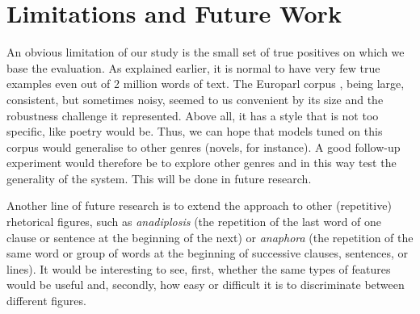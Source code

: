 \documentclass[11pt]{article}
\begin{document}
\section{Limitations and Future Work}

An obvious limitation of our study is the small set of true positives on which we base the evaluation. As explained earlier, it is normal to have very few true examples even out of 2 million words of text. The Europarl corpus \cite{koehn2005}, being large, consistent, but sometimes noisy, seemed to us convenient by its size and the robustness challenge it represented. Above all, it has a style that is not too specific, like poetry would be. Thus, we can hope that models tuned on this corpus would generalise to other genres (novels, for instance). A good follow-up experiment would therefore be to explore other genres and in this way test the generality of the system. This will be done in future research. 


Another line of future research is to extend the approach to other (repetitive) rhetorical figures, such as \emph{anadiplosis} (the repetition of the last word of one clause or sentence at the beginning of the next) or \emph{anaphora} (the repetition of the same word or group of words at the beginning of successive clauses, sentences, or lines). It would be interesting to see, first, whether the same types of features would be useful and, secondly, how easy or difficult it is to discriminate between  different figures.
\end{document}
